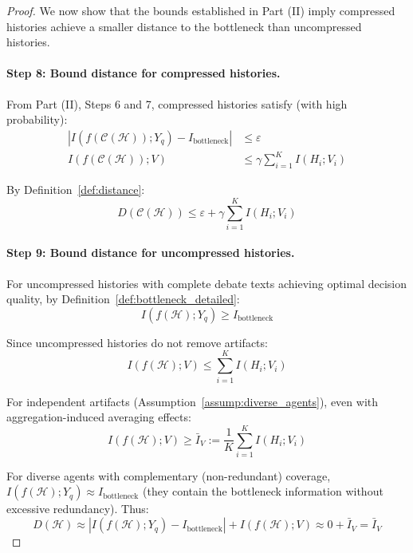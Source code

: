 \documentclass{article}
\theoremstyle{plain}
\theoremstyle{definition}
\theoremstyle{remark}
\begin{document}
\begin{proof}
We now show that the bounds established in Part (II) imply compressed histories achieve a smaller distance to the bottleneck than uncompressed histories.

\paragraph{Step 8: Bound distance for compressed histories.}

From Part (II), Steps 6 and 7, compressed histories satisfy (with high probability):
\begin{align}
|I(f(\mathcal{C}(\mathcal{H})); Y_q) - I_{\text{bottleneck}}| &\leq \varepsilon \\
I(f(\mathcal{C}(\mathcal{H})); V) &\leq \gamma \sum_{i=1}^K I(H_i; V_i)
\end{align}

By Definition~\ref{def:distance}:
\begin{equation}
D(\mathcal{C}(\mathcal{H})) \leq \varepsilon + \gamma \sum_{i=1}^K I(H_i; V_i)
\end{equation}

\paragraph{Step 9: Bound distance for uncompressed histories.}

For uncompressed histories with complete debate texts achieving optimal decision quality, by Definition~\ref{def:bottleneck_detailed}:
\begin{equation}
I(f(\mathcal{H}); Y_q) \geq I_{\text{bottleneck}}
\end{equation}

Since uncompressed histories do not remove artifacts:
\begin{equation}
I(f(\mathcal{H}); V) \leq \sum_{i=1}^K I(H_i; V_i)
\end{equation}

For independent artifacts (Assumption~\ref{assump:diverse_agents}), even with aggregation-induced averaging effects:
\begin{equation}
I(f(\mathcal{H}); V) \geq \bar{I}_V := \frac{1}{K}\sum_{i=1}^K I(H_i; V_i)
\end{equation}

For diverse agents with complementary (non-redundant) coverage, $I(f(\mathcal{H}); Y_q) \approx I_{\text{bottleneck}}$ (they contain the bottleneck information without excessive redundancy). Thus:
\begin{equation}
D(\mathcal{H}) \approx |I(f(\mathcal{H}); Y_q) - I_{\text{bottleneck}}| + I(f(\mathcal{H}); V) \approx 0 + \bar{I}_V = \bar{I}_V
\end{equation}


\end{proof}
\end{document}
